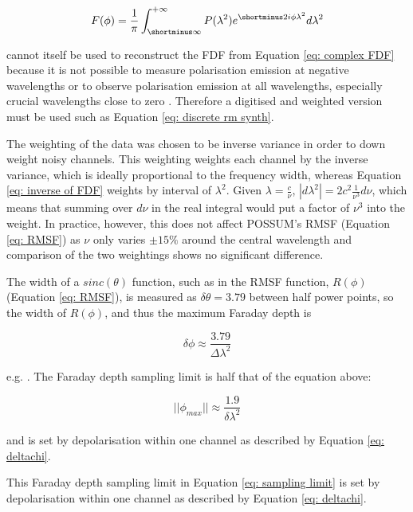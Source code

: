 \begin{equation}
    F(\phi)=\frac{1}{\pi}\int^{+\infty}_{\shortminus\infty}P(\lambda^2)e^{\shortminus2i\phi\lambda^2}d\lambda^2
    \label{eq: inverse of FDF}
\end{equation}

cannot itself be used to reconstruct the FDF from Equation \ref{eq: complex FDF} because it is not possible to measure polarisation emission at negative wavelengths or to observe polarisation emission at all wavelengths, especially crucial wavelengths close to zero \cite{Li_2011}. Therefore a digitised and weighted version must be used such as Equation \ref{eq: discrete rm synth}. 





The weighting of the data was chosen to be inverse variance in order to down weight noisy channels. This weighting weights each channel by the inverse variance, which is ideally proportional to the frequency width, whereas Equation \ref{eq: inverse of FDF} weights by interval of $\lambda^2$. Given $\lambda = \frac{c}{\nu}$, $|d\lambda^2| = 2c^2\frac{1}{\nu^3}d\nu$, which means that summing over $d\nu$ in the real integral would put a factor of $\nu^3$ into the weight. In practice, however, this does not affect POSSUM's RMSF (Equation \ref{eq: RMSF}) as $\nu$ only varies $\pm 15 \%$ around the central wavelength and comparison of the two weightings shows no significant difference.


The width of a $sinc(\theta)$ function, such as in the RMSF function, $R(\phi)$ (Equation \ref{eq: RMSF}), is measured as $\delta\theta = 3.79$ between half power points, so the width of $R(\phi)$, and thus the maximum Faraday depth is 

\begin{equation}
    \delta\phi \approx \frac{3.79}{\Delta\lambda^2}
    \label{}
\end{equation}


e.g. \cite{Dickey_2019}. The Faraday depth sampling limit is half that of the equation above:

\begin{equation}
    ||\phi_{max}|| \approx \frac{1.9}{\delta\lambda^2}
    \label{eq: sampling limit}
\end{equation}

and is set by depolarisation within one channel as described by Equation \ref{eq: deltachi}.


This Faraday depth sampling limit in Equation \ref{eq: sampling limit} is set by depolarisation within one channel as described by Equation \ref{eq: deltachi}. 

